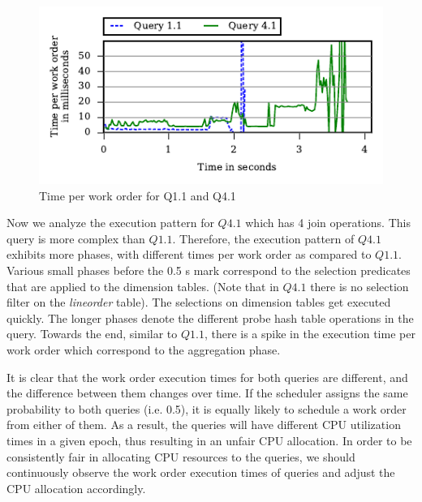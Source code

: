 \begin{figure}[h]
	\centering
	\includegraphics[width=\columnwidth]{figures/q11-q41-time-per-wo.pdf}
	\vspace{-2.5em}
	\caption{Time per work order for Q1.1 and Q4.1}
	\label{fig:q1.1-q4.1-time-per-wo}
\end{figure}

Now we analyze the execution pattern for $Q4.1$ which has 4 join operations. 
This query is more complex than $Q1.1$.%
Therefore, the execution pattern of $Q4.1$ exhibits more phases, with different times per work order as compared to $Q1.1$.
Various small phases before the 0.5 s mark correspond to the selection predicates that are applied to the dimension tables. (Note that in $Q4.1$ there is no selection filter on the \textit{lineorder} table).
The selections on dimension tables get executed quickly.
The longer phases denote the different probe hash table operations in the query.
Towards the end, similar to $Q1.1$, there is a spike in the execution time per work order which correspond to the aggregation phase.

It is clear that the work order execution times for both queries are different, and the difference between them changes over time. 
If the scheduler assigns the same probability to both queries (i.e. 0.5), it is equally likely to schedule a work order from either of them. 
As a result, the queries will have different CPU utilization times in a given epoch, thus resulting in an unfair CPU allocation. 
In order to be consistently fair in allocating CPU resources to the queries, we should continuously observe the work order execution times of queries and adjust the CPU allocation accordingly. 


